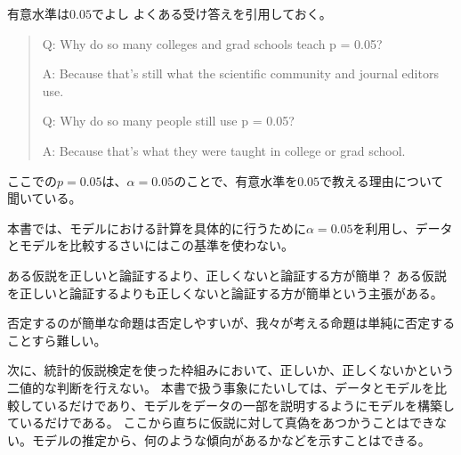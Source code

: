 \begin{SMbox}{有意水準は$0.05$でよし}
    よくある受け答えを引用しておく\cite{greenland2016statistical}。
    \begin{quote}
        Q: Why do so many colleges and grad schools teach p = 0.05?

        A: Because that's still what the scientific community and journal editors use.

        Q: Why do so many people still use p = 0.05?

        A: Because that's what they were taught in college or grad school.
    \end{quote}
 ここでの$p=0.05$は、$\alpha=0.05$のことで、有意水準を$0.05$で教える理由について聞いている。

本書では、モデルにおける計算を具体的に行うために$\alpha=0.05$を利用し、データとモデルを比較するさいにはこの基準を使わない。
\end{SMbox}



\begin{SMbox}{ある仮説を正しいと論証するより、正しくないと論証する方が簡単？}
 ある仮説を正しいと論証するよりも正しくないと論証する方が簡単という主張がある。
 
 否定するのが簡単な命題は否定しやすいが、我々が考える命題は単純に否定することすら難しい。

 次に、統計的仮説検定を使った枠組みにおいて、正しいか、正しくないかという二値的な判断を行えない。
 本書で扱う事象にたいしては、データとモデルを比較しているだけであり、モデルをデータの一部を説明するようにモデルを構築しているだけである。
 ここから直ちに仮説に対して真偽をあつかうことはできない。モデルの推定から、何のような傾向があるかなどを示すことはできる。
\end{SMbox}

